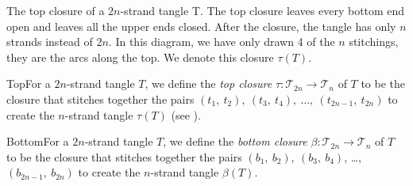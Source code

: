 \begin{paper}
{The top closure of a $2n$-strand tangle T.
The top closure leaves every bottom end open and leaves all the upper ends
closed.
After the closure, the tangle has only $n$ strands instead of $2n$.
In this diagram, we have only drawn 4 of the $n$ stitchings, they are the arcs
along the top.
We denote this closure $\tau(T)$.}

\begin{paperdef}{Top}{For a $2n$-strand tangle $T$, we define the
\textit{top closure} $\tau:\mathcal{T}_{2n}\to\mathcal{T}_n$ of $T$ to be the
closure that stitches together the pairs
$(t_1,~t_2),~(t_3,~t_4),~\dots,~(t_{2n-1},~t_{2n})$ to create the $n$-strand
tangle $\tau(T)$ (see \figTop).}\end{paperdef}

\begin{paperdef}{Bottom}{For a $2n$-strand tangle $T$, we define the
\textit{bottom closure} $\beta:\mathcal{T}_{2n}\to\mathcal{T}_n$ of $T$ to be
the closure that stitches together the pairs $(b_1,~b_2),~(b_3,~b_4)$, \dots,
$(b_{2n-1},~b_{2n})$ to create the $n$-strand tangle $\beta(T)$.}
\end{paperdef}


\end{paper}
